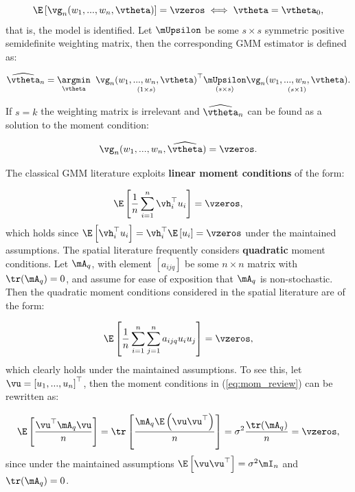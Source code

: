 \documentclass[english,12pt]{book}\usepackage[]{graphicx}\usepackage[]{xcolor}
\begin{document}
\begin{equation*}
\E\left[\vg_n(w_1,...,w_n, \vtheta)\right] = \vzeros \iff \vtheta = \vtheta_0,
\end{equation*}
%
that is, the model is identified. Let $\mUpsilon$ be some $s \times s$ symmetric positive semidefinite weighting matrix, then the corresponding GMM estimator is defined as:

\begin{equation}\label{eq:gmm_one_step}
\widehat{\vtheta}_n = \underset{\vtheta}{\argmin}\;\;\underset{(1\times s)}{\vg_n(w_1,...,w_n, \vtheta)}^\top\underset{(s\times s)}{\mUpsilon}\underset{(s\times 1)}{\vg_n(w_1,...,w_n, \vtheta)}.
\end{equation}

If $s = k$  the weighting matrix is irrelevant and $\widehat{\vtheta}_n$ can be found as a solution to the moment condition:

\begin{equation}\label{eq:sample_moments_gmm}
\vg_n(w_1,...,w_n, \widehat{\vtheta}) = \vzeros.
\end{equation}

The classical GMM literature exploits \textbf{linear moment conditions} of the form:

\begin{equation*}
	\E\left[\frac{1}{n}\sum_{i =1}^n\vh_{i}^\top u_i\right] = \vzeros,
\end{equation*}
%
which holds since $\E\left[\vh_{i}^\top u_i\right] = \vh_{i}^\top \E\left[u_i\right] = \vzeros$ under the maintained assumptions. The spatial literature frequently considers \textbf{quadratic} moment conditions. Let $\mA_q$, with element $\left[a_{ijq}\right]$ be some $n \times n$ matrix with $\tr(\mA_q) = 0$, and assume for ease of exposition that $\mA_q$ is non-stochastic. Then the quadratic moment conditions considered in the spatial literature are of the form:

\begin{equation}\label{eq:mom_review}
	\E\left[\frac{1}{n}\sum_{i = 1}^n\sum_{j = 1} ^n a_{ijq}u_iu_j\right] = \vzeros,
\end{equation}
%
which clearly holds under the maintained assumptions. To see this, let $\vu = \left[u_1,...,u_n\right]^\top$, then the moment conditions in (\ref{eq:mom_review}) can be rewritten as:

\begin{equation*}
 \E\left[\frac{\vu^\top\mA_q\vu}{n}\right] = \tr\left[\frac{\mA_q\E\left(\vu\vu^\top\right)}{n}\right] = \sigma^2\frac{\tr(\mA_q)}{n} = \vzeros,
\end{equation*}
%
since under the maintained assumptions $\E\left[\vu\vu^\top\right] = \sigma^2\mI_n$ and $\tr(\mA_q) = 0$.
\end{document}
